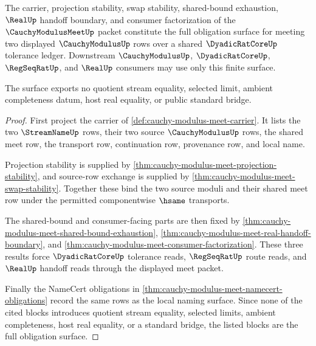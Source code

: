 \begin{theorem}\label{thm:cauchymodulusmeet-obligation-surface}
The carrier, projection stability, swap stability, shared-bound exhaustion, $\RealUp$ handoff boundary, and consumer factorization of the $\CauchyModulusMeetUp$ packet constitute the full obligation surface for meeting two displayed $\CauchyModulusUp$ rows over a shared $\DyadicRatCoreUp$ tolerance ledger. Downstream $\CauchyModulusUp$, $\DyadicRatCoreUp$, $\RegSeqRatUp$, and $\RealUp$ consumers may use only this finite surface.

The surface exports no quotient stream equality, selected limit, ambient completeness datum, host real equality, or public standard bridge.
\end{theorem}
\begin{proof}
First project the carrier of \autoref{def:cauchy-modulus-meet-carrier}. It lists the two $\StreamNameUp$ rows, their two source $\CauchyModulusUp$ rows, the shared meet row, the transport row, continuation row, provenance row, and local name.

Projection stability is supplied by \autoref{thm:cauchy-modulus-meet-projection-stability}, and source-row exchange is supplied by \autoref{thm:cauchy-modulus-meet-swap-stability}. Together these bind the two source moduli and their shared meet row under the permitted componentwise $\hsame$ transports.

The shared-bound and consumer-facing parts are then fixed by \autoref{thm:cauchy-modulus-meet-shared-bound-exhaustion}, \autoref{thm:cauchy-modulus-meet-real-handoff-boundary}, and \autoref{thm:cauchy-modulus-meet-consumer-factorization}. These three results force $\DyadicRatCoreUp$ tolerance reads, $\RegSeqRatUp$ route reads, and $\RealUp$ handoff reads through the displayed meet packet.

Finally the NameCert obligations in \autoref{thm:cauchy-modulus-meet-namecert-obligations} record the same rows as the local naming surface. Since none of the cited blocks introduces quotient stream equality, selected limits, ambient completeness, host real equality, or a standard bridge, the listed blocks are the full obligation surface.
\end{proof}

